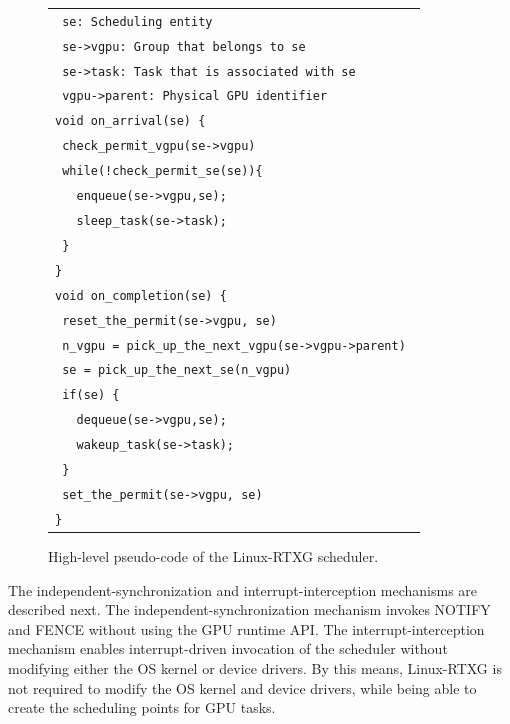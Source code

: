 \begin{figure}[!t]
\begin{center}
\begin{tabular}{l}
\hline
{\scriptsize \verb| se: Scheduling entity |}\\
{\scriptsize \verb| se->vgpu: Group that belongs to se|}\\
{\scriptsize \verb| se->task: Task that is associated with se |}\\
{\scriptsize \verb| vgpu->parent: Physical GPU identifier|}\\
\hline
{\scriptsize \verb|void on_arrival(se) {|}\\
{\scriptsize \verb| check_permit_vgpu(se->vgpu)    |}\\
{\scriptsize \verb| while(!check_permit_se(se)){|}\\
{\scriptsize \verb|   enqueue(se->vgpu,se); |}\\
{\scriptsize \verb|   sleep_task(se->task); |}\\
{\scriptsize \verb| }|}\\
{\scriptsize \verb|}|}\\
{\scriptsize \verb|void on_completion(se) {|}\\
{\scriptsize \verb| reset_the_permit(se->vgpu, se)|}\\
{\scriptsize \verb| n_vgpu = pick_up_the_next_vgpu(se->vgpu->parent) |}\\
{\scriptsize \verb| se = pick_up_the_next_se(n_vgpu)|}\\
{\scriptsize \verb| if(se) {|}\\
{\scriptsize \verb|   dequeue(se->vgpu,se);|}\\
{\scriptsize \verb|   wakeup_task(se->task);|}\\
{\scriptsize \verb| }|}\\
{\scriptsize \verb| set_the_permit(se->vgpu, se)|}\\
{\scriptsize \verb|}|}\\
\hline
\end{tabular}
\caption{High-level pseudo-code of the Linux-RTXG scheduler.}
\vspace{-4mm}
\label{fig:scheduling}
\end{center}
\end{figure}

The independent-synchronization and interrupt-interception mechanisms are described next.
The independent-synchronization mechanism invokes NOTIFY and FENCE without using the GPU runtime API.
The interrupt-interception mechanism enables interrupt-driven invocation of the scheduler without modifying either the OS kernel or device drivers.
By this means, Linux-RTXG is not required to modify the OS kernel and device drivers, while being able to create the scheduling points for GPU tasks.

